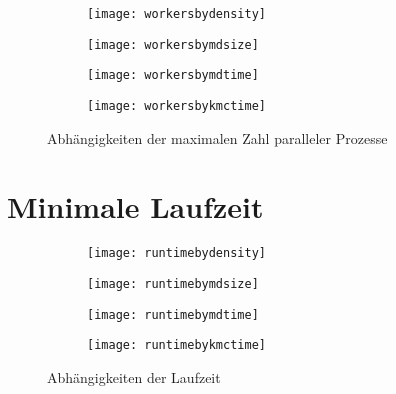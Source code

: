 
\begin{figure}[!hp]
  
  \captionsetup[subfigure]{singlelinecheck=false}
  \def\subfigwidth{7cm}
  \begin{subfigure}[t]{\subfigwidth}
    \texttt{[image: workersbydensity]}
  \end{subfigure}
  \hfill
  \begin{subfigure}[t]{\subfigwidth}
    \texttt{[image: workersbymdsize]}
  \end{subfigure}

  \begin{subfigure}[t]{\subfigwidth}
    \texttt{[image: workersbymdtime]}
  \end{subfigure}
  \hfill
  \begin{subfigure}[t]{\subfigwidth}
    \texttt{[image: workersbykmctime]}
  \end{subfigure}
  \hfill

  \caption{Abhängigkeiten der maximalen Zahl paralleler Prozesse}
  
\end{figure}


\section{Minimale Laufzeit}


\begin{figure}[!hp]
  
  \captionsetup[subfigure]{singlelinecheck=false}
  \def\subfigwidth{7cm}
  \begin{subfigure}[t]{\subfigwidth}
    \texttt{[image: runtimebydensity]}
  \end{subfigure}
  \hfill
  \begin{subfigure}[t]{\subfigwidth}
    \texttt{[image: runtimebymdsize]}
  \end{subfigure}

  \begin{subfigure}[t]{\subfigwidth}
    \texttt{[image: runtimebymdtime]}
  \end{subfigure}
  \hfill
  \begin{subfigure}[t]{\subfigwidth}
    \texttt{[image: runtimebykmctime]}
  \end{subfigure}
  \hfill

  \caption{Abhängigkeiten der Laufzeit}
  
\end{figure}
